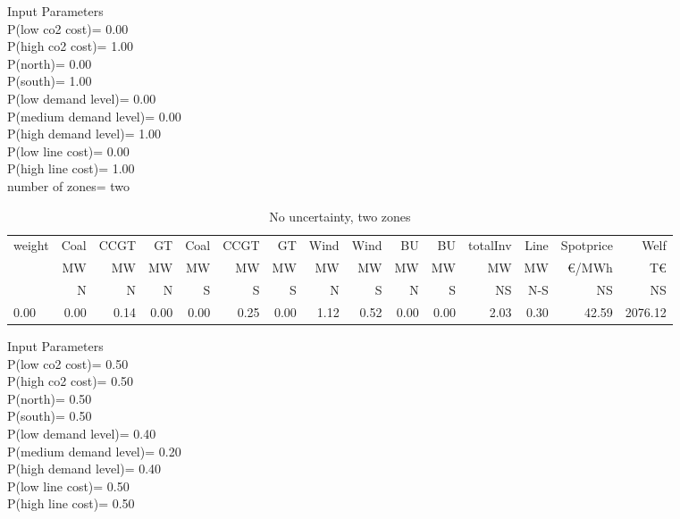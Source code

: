 \documentclass[landscape]{article}
\begin{document}
\noindent
Input Parameters\\
P(low co2 cost)=         0.00\\
P(high co2 cost)=         1.00\\
P(north)=         0.00\\
P(south)=         1.00\\
P(low demand level)=         0.00\\
P(medium demand level)=         0.00\\
P(high demand level)=         1.00\\
P(low line cost)=         0.00\\
P(high line cost)=         1.00\\
number of zones= two\\
\begin{table}[htb]\caption{No uncertainty, two zones}
\begin{tabular}{l|rrrrrr|rr|rr|rr|rr}
\toprule
 weight &    Coal &     CCGT &      GT &   Coal  &   CCGT &      GT &    Wind &    Wind  &  BU  &  BU  & totalInv  &    Line   &  Spotprice   &  Welf   \\
        &      MW &       MW &      MW &      MW &     MW &      MW &      MW &      MW  &  MW  &  MW  &    MW     &    MW     &  \euro/MWh &  T\euro   \\
        &       N &       N  &      N  &      S  &      S &       S &       N &       S  &  N   &  S   &    NS     &    N-S    &  NS      &   NS    \\
\midrule
        0.00&        0.00&        0.14&        0.00&        0.00&        0.25&        0.00&        1.12&        0.52&        0.00&        0.00&        2.03&        0.30&       42.59&     2076.12\\
\bottomrule
\end{tabular}
\end{table}
\clearpage
\noindent
Input Parameters\\
P(low co2 cost)=         0.50\\
P(high co2 cost)=         0.50\\
P(north)=         0.50\\
P(south)=         0.50\\
P(low demand level)=         0.40\\
P(medium demand level)=         0.20\\
P(high demand level)=         0.40\\
P(low line cost)=         0.50\\
P(high line cost)=         0.50\\
\end{document}
